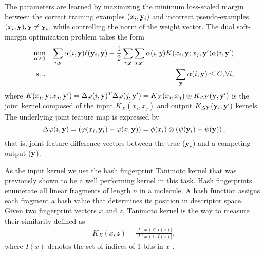 \documentclass[runningheads,a4paper]{llncs}
\newcommand{\KK}{K}
\newcommand{\yb}{{\bf y}}
\newcommand{\wb}{{\bf w}}
\begin{document}
The parameters are learned by maximizing the minimum loss-scaled margin 
between the correct training examples $(x_i,\yb_i)$ and incorrect pseudo-examples $(x_i,\yb), \yb \neq \yb_i$, while controlling the norm of the weight vector.
The dual  soft-margin optimization problem takes the form
\begin{eqnarray}
\underset{\alpha \geq 0}{\min} && \sum_{i,\yb} \alpha(i,\yb) \ell(\yb_i,\yb)
- \frac{1}{2} \sum_{i,\yb}\sum_{j,\yb'}\alpha(i,y) \KK(x_i,\yb;x_j,\yb') \alpha(i,\yb') \nonumber \\
  \text{s.t.} && \sum_{\yb} \alpha(i,\yb) \le C, \forall i \label{orig_dual},
\end{eqnarray}
where $\KK(x_i,\yb;x_j,\yb') = \Delta \varphi(i,\yb)^T \Delta \varphi(j,\yb') = K_X(x_i,x_j)\odot K_{\Delta Y}(\yb,\yb')$ is the joint kernel
composed of the input $K_X(x_i,x_j)$ and output $K_{\Delta Y}(\yb_i,\yb')$ kernels. The underlying joint feature map is expressed by
$$\Delta \varphi(i,\yb) = \left(\varphi(x_i,\yb_i)-\varphi(x,\yb)\right) = \phi(x_i)\otimes\left(\psi(\yb_i) - \psi(\yb)\right),$$ 
that is, joint feature difference vectors between the true ($\yb_i$) and  a competing output ($\yb$).


As the input kernel we use the hash fingerprint Tanimoto kernel \cite{ralaivola05} that was previously shown \cite{su2010} to be a well performing kernel in this task. Hash fingerprints enumerate all linear fragments of length $n$ in a molecule. A hash function assigns each fragment a hash value that determines its position in descriptor space. Given two  fingerprint vectors $x$ and $z$, Tanimoto kernel is the way to measure their similarity defined as
\begin{align*}
	K_X(x,z) = \frac{|I(x) \cap I(z)|}{|I(x)\cup I(z)|},
\end{align*}
where $I(x)$ denotes the set of indices of $1$-bits in $x$ .
\end{document}
